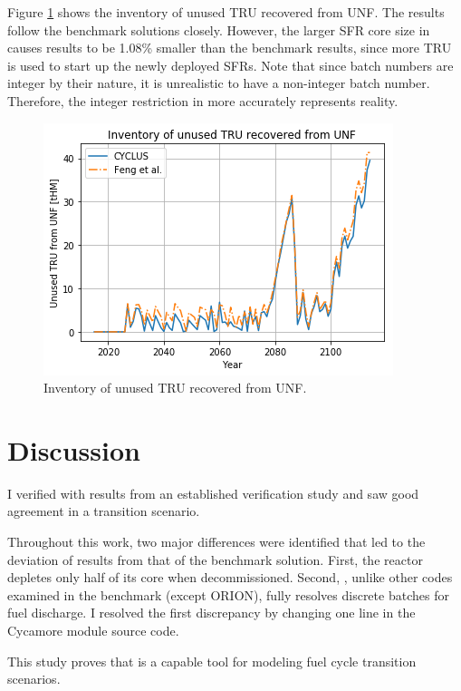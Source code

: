 Figure \ref{fig:tru} shows the inventory of unused \gls{TRU} recovered from \gls{UNF}.
The \Cyclus results follow the benchmark solutions closely. However,
the larger \gls{SFR} core size in \Cyclus causes \Cyclus results to be 1.08\% smaller than the benchmark results,
since more \gls{TRU} is used to
start up the newly deployed \glspl{SFR}. Note that since
batch numbers are integer by their nature, it is unrealistic
to have a non-integer batch number. Therefore, the integer
restriction in \Cyclus more accurately represents reality.

\begin{figure}[htbp!]
	\begin{center}
		\includegraphics[scale=0.7]{./images/results_18/tru.png}
	\end{center}
	\caption{Inventory of unused \gls{TRU} recovered from \gls{UNF}.}
	\label{fig:tru}
\end{figure}

\FloatBarrier

\section{Discussion}

I verified \Cyclus with results from an established
verification study and saw good agreement
in a transition scenario.

Throughout this work, two major differences were identified
that led to the deviation
of \Cyclus results from that of the benchmark solution. First,
the \Cycamore reactor depletes only half of its core
when decommissioned. Second, \Cyclus, unlike other
codes examined in the benchmark (except ORION), fully resolves
discrete batches for fuel discharge.
I resolved the first discrepancy by changing one line in the Cycamore module
source code.

This study proves that \Cyclus is a capable tool for modeling
fuel cycle transition scenarios.
